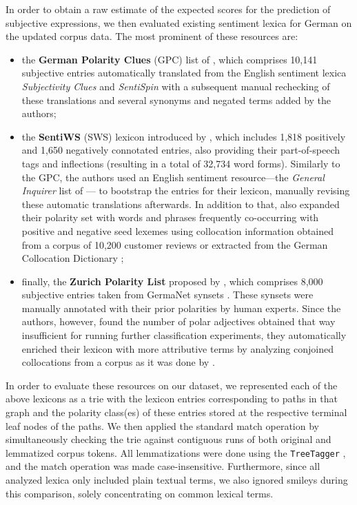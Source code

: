 In order to obtain a raw estimate of the expected scores for the
prediction of subjective expressions, we then evaluated existing
sentiment lexica for German on the updated corpus data.  The most
prominent of these resources are:
\begin{itemize}
\item the \textbf{German Polarity Clues} (GPC) list of
  \citet{Waltinger:10}, which comprises 10,141 subjective entries
  automatically translated from the English sentiment lexica
  \emph{Subjectivity Clues} \cite{Wilson:05} and \emph{SentiSpin}
  \cite{Takamura:05} with a subsequent manual rechecking of these
  translations and several synonyms and negated terms added by the
  authors;

\item the \textbf{SentiWS} (SWS) lexicon introduced by
  \citet{Remus:10}, which includes 1,818 positively and 1,650
  negatively connotated entries, also providing their part-of-speech
  tags and inflections (resulting in a total of 32,734 word forms).
  Similarly to the GPC, the authors used an English sentiment
  resource---the \emph{General Inquirer} list of \citet{Stone:66}---
  to bootstrap the entries for their lexicon, manually revising these
  automatic translations afterwards.  In addition to that,
  \citet{Remus:10} also expanded their polarity set with words and
  phrases frequently co-occurring with positive and negative seed
  lexemes using collocation information obtained from a corpus of
  10,200 customer reviews or extracted from the German Collocation
  Dictionary \cite{Quasthoff:10};

\item finally, the \textbf{Zurich Polarity List} proposed by
  \citet{Clematide:10}, which comprises 8,000 subjective entries taken
  from GermaNet synsets \cite{Hamp:97}.  These synsets were manually
  annotated with their prior polarities by human experts.  Since the
  authors, however, found the number of polar adjectives obtained that
  way insufficient for running further classification experiments,
  they automatically enriched their lexicon with more attributive
  terms by analyzing conjoined collocations from a corpus as it was
  done by \citet{Hatzivassi:97}.
\end{itemize}

In order to evaluate these resources on our dataset, we represented
each of the above lexicons as a trie \cite[pp. 492--512]{Knuth:98}
with the lexicon entries corresponding to paths in that graph and the
polarity class(es) of these entries stored at the respective terminal
leaf nodes of the paths.  We then applied the standard match operation
by simultaneously checking the trie against contiguous runs of both
original and lemmatized corpus tokens.  All lemmatizations were done
using the \texttt{TreeTagger} \cite{Schmid:95}, and the match
operation was made case-insensitive.  Furthermore, since all analyzed
lexica only included plain textual terms, we also ignored smileys
during this comparison, solely concentrating on common lexical terms.

